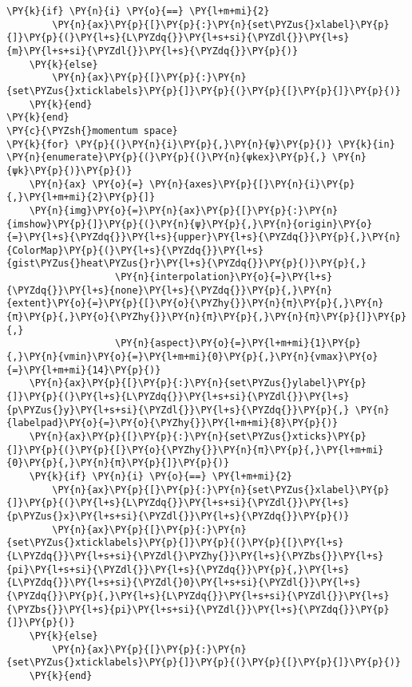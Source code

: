 \begin{Verbatim}[commandchars=\\\{\}]
    \PY{k}{if} \PY{n}{i} \PY{o}{==} \PY{l+m+mi}{2}
        \PY{n}{ax}\PY{p}{[}\PY{p}{:}\PY{n}{set\PYZus{}xlabel}\PY{p}{]}\PY{p}{(}\PY{l+s}{L\PYZdq{}}\PY{l+s+si}{\PYZdl{}}\PY{l+s}{m}\PY{l+s+si}{\PYZdl{}}\PY{l+s}{\PYZdq{}}\PY{p}{)}
    \PY{k}{else}
        \PY{n}{ax}\PY{p}{[}\PY{p}{:}\PY{n}{set\PYZus{}xticklabels}\PY{p}{]}\PY{p}{(}\PY{p}{[}\PY{p}{]}\PY{p}{)}
    \PY{k}{end}
\PY{k}{end}
\PY{c}{\PYZsh{}momentum space}
\PY{k}{for} \PY{p}{(}\PY{n}{i}\PY{p}{,}\PY{n}{ψ}\PY{p}{)} \PY{k}{in} \PY{n}{enumerate}\PY{p}{(}\PY{p}{(}\PY{n}{ψkex}\PY{p}{,} \PY{n}{ψk}\PY{p}{)}\PY{p}{)}
    \PY{n}{ax} \PY{o}{=} \PY{n}{axes}\PY{p}{[}\PY{n}{i}\PY{p}{,}\PY{l+m+mi}{2}\PY{p}{]}
    \PY{n}{img}\PY{o}{=}\PY{n}{ax}\PY{p}{[}\PY{p}{:}\PY{n}{imshow}\PY{p}{]}\PY{p}{(}\PY{n}{ψ}\PY{p}{,}\PY{n}{origin}\PY{o}{=}\PY{l+s}{\PYZdq{}}\PY{l+s}{upper}\PY{l+s}{\PYZdq{}}\PY{p}{,}\PY{n}{ColorMap}\PY{p}{(}\PY{l+s}{\PYZdq{}}\PY{l+s}{gist\PYZus{}heat\PYZus{}r}\PY{l+s}{\PYZdq{}}\PY{p}{)}\PY{p}{,}
                   \PY{n}{interpolation}\PY{o}{=}\PY{l+s}{\PYZdq{}}\PY{l+s}{none}\PY{l+s}{\PYZdq{}}\PY{p}{,}\PY{n}{extent}\PY{o}{=}\PY{p}{[}\PY{o}{\PYZhy{}}\PY{n}{π}\PY{p}{,}\PY{n}{π}\PY{p}{,}\PY{o}{\PYZhy{}}\PY{n}{π}\PY{p}{,}\PY{n}{π}\PY{p}{]}\PY{p}{,}
                   \PY{n}{aspect}\PY{o}{=}\PY{l+m+mi}{1}\PY{p}{,}\PY{n}{vmin}\PY{o}{=}\PY{l+m+mi}{0}\PY{p}{,}\PY{n}{vmax}\PY{o}{=}\PY{l+m+mi}{14}\PY{p}{)}
    \PY{n}{ax}\PY{p}{[}\PY{p}{:}\PY{n}{set\PYZus{}ylabel}\PY{p}{]}\PY{p}{(}\PY{l+s}{L\PYZdq{}}\PY{l+s+si}{\PYZdl{}}\PY{l+s}{p\PYZus{}y}\PY{l+s+si}{\PYZdl{}}\PY{l+s}{\PYZdq{}}\PY{p}{,} \PY{n}{labelpad}\PY{o}{=}\PY{o}{\PYZhy{}}\PY{l+m+mi}{8}\PY{p}{)}
    \PY{n}{ax}\PY{p}{[}\PY{p}{:}\PY{n}{set\PYZus{}xticks}\PY{p}{]}\PY{p}{(}\PY{p}{[}\PY{o}{\PYZhy{}}\PY{n}{π}\PY{p}{,}\PY{l+m+mi}{0}\PY{p}{,}\PY{n}{π}\PY{p}{]}\PY{p}{)}
    \PY{k}{if} \PY{n}{i} \PY{o}{==} \PY{l+m+mi}{2}
        \PY{n}{ax}\PY{p}{[}\PY{p}{:}\PY{n}{set\PYZus{}xlabel}\PY{p}{]}\PY{p}{(}\PY{l+s}{L\PYZdq{}}\PY{l+s+si}{\PYZdl{}}\PY{l+s}{p\PYZus{}x}\PY{l+s+si}{\PYZdl{}}\PY{l+s}{\PYZdq{}}\PY{p}{)}
        \PY{n}{ax}\PY{p}{[}\PY{p}{:}\PY{n}{set\PYZus{}xticklabels}\PY{p}{]}\PY{p}{(}\PY{p}{[}\PY{l+s}{L\PYZdq{}}\PY{l+s+si}{\PYZdl{}\PYZhy{}}\PY{l+s}{\PYZbs{}}\PY{l+s}{pi}\PY{l+s+si}{\PYZdl{}}\PY{l+s}{\PYZdq{}}\PY{p}{,}\PY{l+s}{L\PYZdq{}}\PY{l+s+si}{\PYZdl{}0}\PY{l+s+si}{\PYZdl{}}\PY{l+s}{\PYZdq{}}\PY{p}{,}\PY{l+s}{L\PYZdq{}}\PY{l+s+si}{\PYZdl{}}\PY{l+s}{\PYZbs{}}\PY{l+s}{pi}\PY{l+s+si}{\PYZdl{}}\PY{l+s}{\PYZdq{}}\PY{p}{]}\PY{p}{)}
    \PY{k}{else}
        \PY{n}{ax}\PY{p}{[}\PY{p}{:}\PY{n}{set\PYZus{}xticklabels}\PY{p}{]}\PY{p}{(}\PY{p}{[}\PY{p}{]}\PY{p}{)}
    \PY{k}{end}

\end{Verbatim}
